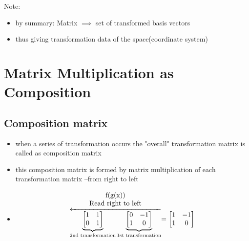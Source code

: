 \documentclass[a4paper]{article}
\begin{document}
Note:
\begin{itemize}
	\item by summary: Matrix $\implies$ set of transformed basis vectors
	\item thus giving transformation data of the space(coordinate system)
\end{itemize}


\newpage
\section{Matrix Multiplication as Composition}

\subsection{Composition matrix}
\begin{itemize}
	\item when a series of transformation occurs the "overall"
	      transformation matrix is called as composition matrix
	\item this composition matrix is formed by matrix multiplication
	      of each transformation matrix --from right to left
	\item \[
		      \stackrel{
		      \begin{tabular}{c}
			      f(g(x))                   \\
			      \text{Read right to left} \\
		      \end{tabular}
		      }{
		      \overleftarrow{
		      \underbrace{\begin{bmatrix} 1 & 1 \\ 0 & 1 \end{bmatrix}}
		      _{\text{2nd transformation}}
		      \underbrace{\begin{bmatrix} 0 & -1 \\ 1 & 0\end{bmatrix}}
		      _{\text{1st transformation}}
		      }
		      }
		      = \begin{bmatrix} 1 & -1 \\ 1 & 0\end{bmatrix} \\
	      \]
\end{itemize}
\end{document}
